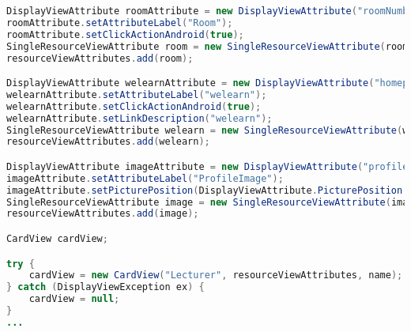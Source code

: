 \begin{lstlisting}[label=lst:cardview_impl,
language=java,
firstnumber=1,
caption=Erstellung einer CardView.]
DisplayViewAttribute roomAttribute = new DisplayViewAttribute("roomNumber", ViewAttribute.AttributeType.HOME);
roomAttribute.setAttributeLabel("Room");
roomAttribute.setClickActionAndroid(true);
SingleResourceViewAttribute room = new SingleResourceViewAttribute(roomAttribute);
resourceViewAttributes.add(room);

DisplayViewAttribute welearnAttribute = new DisplayViewAttribute("homepage", ViewAttribute.AttributeType.URL);
welearnAttribute.setAttributeLabel("welearn");
welearnAttribute.setClickActionAndroid(true);
welearnAttribute.setLinkDescription("welearn");
SingleResourceViewAttribute welearn = new SingleResourceViewAttribute(welearnAttribute);
resourceViewAttributes.add(welearn);

DisplayViewAttribute imageAttribute = new DisplayViewAttribute("profileImageUrl", ViewAttribute.AttributeType.PICTURE);
imageAttribute.setAttributeLabel("ProfileImage");
imageAttribute.setPicturePosition(DisplayViewAttribute.PicturePosition.LEFT);
SingleResourceViewAttribute image = new SingleResourceViewAttribute(imageAttribute);
resourceViewAttributes.add(image);

CardView cardView;

try {
	cardView = new CardView("Lecturer", resourceViewAttributes, name);
} catch (DisplayViewException ex) {
	cardView = null;
}
...
\end{lstlisting}